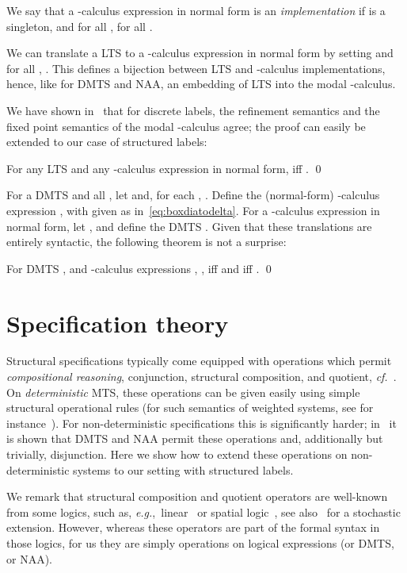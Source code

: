 \documentclass[twocolumn]{svjour3-dummy}
\newcommand*\cf{\textit{cf.}\xspace}
\newcommand*\eg{\textit{e.g.},}
\newcommand*\NAA{NAA\xspace}
\newcommand*\noproof{\qed}
\begin{document}
We say that a -calculus expression  in normal
form is an \emph{implementation} if  is a singleton,
 and
 for all , for all .  

We can translate a LTS  to a -calculus
expression  in normal form by setting  and  for all , .  This defines a bijection
between LTS and -calculus implementations, hence, like for DMTS
and \NAA, an embedding of LTS into the modal -calculus.

We have shown in~\cite[Thm.~15]{DBLP:conf/ictac/FahrenbergLT14} that
for discrete labels, the refinement semantics and the fixed point
semantics of the modal -calculus agree; the proof can easily be
extended to our case of structured labels:

\begin{theorem}
  For any LTS  and any -calculus expression  in normal
  form,  iff .  \noproof
\end{theorem}

For a DMTS  and all , let
 and, for each ,
.  Define the (normal-form)
-calculus expression , with 
given as in~\eqref{eq:boxdiatodelta}.
For a -calculus expression  in normal form,
let ,  and define the
DMTS .  Given that these
translations are entirely syntactic, the following theorem is not a
surprise:

\begin{theorem}
  \label{th:dmtsvsnu-bool}
  For DMTS ,  and -calculus expressions ,
  ,  iff  and
   iff .  \noproof
\end{theorem}

\section{Specification theory}
\label{se:specth}

Structural specifications typically come equipped with operations
which permit \emph{compositional reasoning}, \viz conjunction,
structural composition, and quotient,
\cf~\cite{DBLP:conf/fase/BauerDHLLNW12}.  On \emph{deterministic} MTS,
these operations can be given easily using simple structural
operational rules (for such semantics of weighted systems, see for
instance~\cite{DBLP:journals/iandc/KlinS13}).  For non-deterministic
specifications this is significantly harder;
in~\cite{DBLP:conf/concur/BenesDFKL13} it is shown that DMTS and \NAA
permit these operations and, additionally but trivially, disjunction.
Here we show how to extend these operations on non-deterministic
systems to our setting with structured labels.

We remark that structural composition and quotient operators are
well-known from some logics, such as,
\eg~linear~\cite{DBLP:journals/tcs/Girard87} or spatial
logic~\cite{DBLP:journals/iandc/CairesC03}, see
also~\cite{DBLP:conf/icalp/CardelliLM11} for a stochastic extension.
However, whereas these operators are part of the formal syntax in
those logics, for us they are simply operations on logical expressions
(or DMTS, or \NAA).
\end{document}

